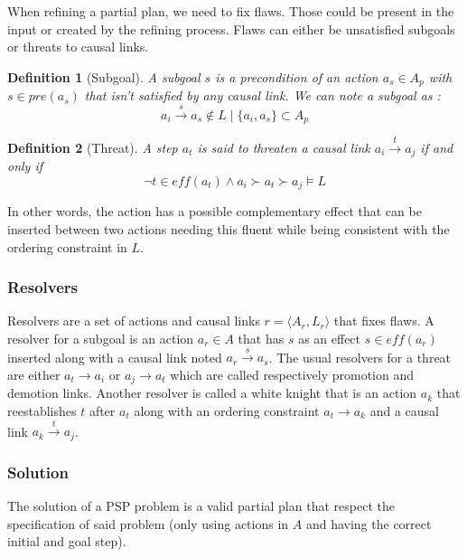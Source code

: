 \documentclass[]{article}
\newtheorem{definition}{Definition}
\begin{document}
When refining a partial plan, we need to fix flaws. Those could be
present in the input or created by the refining process. Flaws can
either be unsatisfied subgoals or threats to causal links.

\begin{definition}[Subgoal]

A subgoal \(s\) is a precondition of an action \(a_s \in A_p\) with
\(s \in pre(a_s)\) that isn't satisfied by any causal link. We can note
a subgoal as :
\[a_i \xrightarrow{s} a_s \notin L \mid \{ a_i, a_s \} \subset A_p \]

\end{definition}

\begin{definition}[Threat]

A step \(a_t\) is said to threaten a causal link
\(a_i \xrightarrow{t} a_j\) if and only if
\[\neg t \in eff(a_t) \land a_i \succ a_t \succ a_j \models L\]

\end{definition}

In other words, the action has a possible complementary effect that can
be inserted between two actions needing this fluent while being
consistent with the ordering constraint in \(L\).

\subsubsection{Resolvers}\label{resolvers}

Resolvers are a set of actions and causal links
\(r = \langle A_r , L_r \rangle\) that fixes flaws. A resolver for a
subgoal is an action \(a_r \in A\) that has \(s\) as an effect
\(s \in eff(a_r)\) inserted along with a causal link noted
\(a_r \xrightarrow{s} a_s\). The usual resolvers for a threat are either
\(a_t \to a_i\) or \(a_j \to a_t\) which are called respectively
promotion and demotion links. Another resolver is called a white knight
that is an action \(a_k\) that reestablishes \(t\) after \(a_t\) along
with an ordering constraint \(a_t \to a_k\) and a causal link
\(a_k \xrightarrow{t} a_j\).

\subsubsection{Solution}\label{solution}

The solution of a PSP problem is a valid partial plan that respect the
specification of said problem (only using actions in \(A\) and having
the correct initial and goal step).
\end{document}
